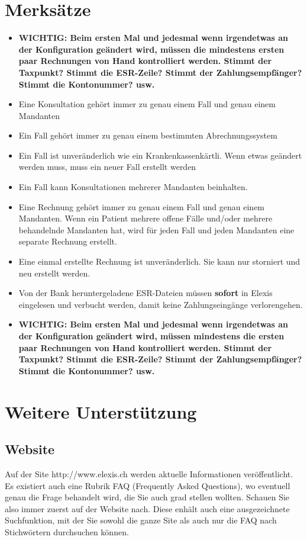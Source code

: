 \documentclass[a4paper]{scrartcl}
\begin{document}
\section{Merksätze}
\begin{itemize}
\item \textbf{WICHTIG: Beim ersten Mal und jedesmal wenn irgendetwas an der Konfiguration geändert wird, müssen die mindestens ersten paar Rechnungen von Hand kontrolliert werden. Stimmt der Taxpunkt? Stimmt die ESR-Zeile? Stimmt der Zahlungsempfänger? Stimmt die Kontonummer? usw.}
\item Eine Konsultation gehört immer zu genau einem Fall und genau einem Mandanten
\item Ein Fall gehört immer zu genau einem bestimmten Abrechnungssystem
\item Ein Fall ist unveränderlich wie ein Krankenkassenkärtli. Wenn etwas geändert werden muss, muss ein neuer Fall erstellt werden
\item Ein Fall kann Konsultationen mehrerer Mandanten beinhalten.
\item Eine Rechnung gehört immer zu genau einem Fall und genau einem Mandanten. Wenn ein Patient mehrere offene Fälle und/oder mehrere behandelnde Mandanten hat, wird für jeden Fall und jeden Mandanten eine separate Rechnung erstellt.
\item Eine einmal erstellte Rechnung ist unveränderlich. Sie kann nur storniert und neu erstellt werden.
\item Von der Bank heruntergeladene ESR-Dateien müssen \textbf{sofort} in Elexis eingelesen und verbucht werden, damit keine Zahlungseingänge verlorengehen.
\item \textbf{WICHTIG: Beim ersten Mal und jedesmal wenn irgendetwas an der Konfiguration geändert wird, müssen mindestens die ersten paar Rechnungen von Hand kontrolliert werden. Stimmt der Taxpunkt? Stimmt die ESR-Zeile? Stimmt der Zahlungsempfänger? Stimmt die Kontonummer? usw.}

\end{itemize}

\section{Weitere Unterstützung}
\subsection{Website}
Auf der Site http://www.elexis.ch werden aktuelle Informationen veröffentlicht. Es existiert auch eine Rubrik FAQ (Frequently Asked Questions), wo eventuell genau die Frage behandelt wird, die Sie auch grad stellen wollten. Schauen Sie also immer zuerst auf der Website nach. Diese enhält auch eine ausgezeichnete Suchfunktion, mit der Sie sowohl die ganze Site als auch nur die FAQ nach Stichwörtern durchsuchen können.
\end{document}
